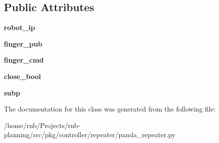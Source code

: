 \subsection*{Public Attributes}
\begin{DoxyCompactItemize}
\item 
\mbox{\label{classrnb-planning_1_1src_1_1pkg_1_1controller_1_1repeater_1_1panda__repeater_1_1_panda_repeater_ac49c74da60e666b782cf3d1918a774e7}} 
{\bfseries robot\+\_\+ip}
\item 
\mbox{\label{classrnb-planning_1_1src_1_1pkg_1_1controller_1_1repeater_1_1panda__repeater_1_1_panda_repeater_a2c0560c136ebb6c0b1b3889ae8b75558}} 
{\bfseries finger\+\_\+pub}
\item 
\mbox{\label{classrnb-planning_1_1src_1_1pkg_1_1controller_1_1repeater_1_1panda__repeater_1_1_panda_repeater_acd5df1a3f05474e40fcf135c9eda4e06}} 
{\bfseries finger\+\_\+cmd}
\item 
\mbox{\label{classrnb-planning_1_1src_1_1pkg_1_1controller_1_1repeater_1_1panda__repeater_1_1_panda_repeater_a873f8cdd308c82ce868bc0af87e886ae}} 
{\bfseries close\+\_\+bool}
\item 
\mbox{\label{classrnb-planning_1_1src_1_1pkg_1_1controller_1_1repeater_1_1panda__repeater_1_1_panda_repeater_acbc74f379e157da0f15d179478d3fcee}} 
{\bfseries subp}
\end{DoxyCompactItemize}


The documentation for this class was generated from the following file\+:\begin{DoxyCompactItemize}
\item 
/home/rnb/\+Projects/rnb-\/planning/src/pkg/controller/repeater/panda\+\_\+repeater.\+py\end{DoxyCompactItemize}
